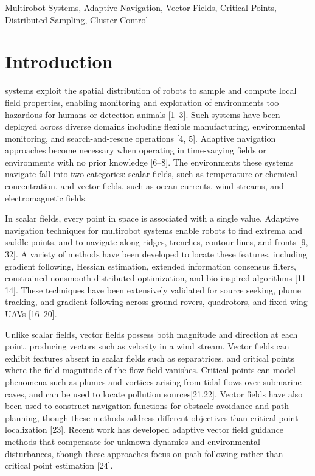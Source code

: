 \documentclass[lettersize,journal]{IEEEtran}
\begin{document}
\begin{IEEEkeywords}
Multirobot Systems, Adaptive Navigation, Vector Fields, Critical Points, Distributed Sampling, Cluster Control
\end{IEEEkeywords}

\section{Introduction}

 systems exploit the spatial distribution of robots to sample and compute local field properties, enabling monitoring and exploration of environments too hazardous for humans or detection animals [1--3]. Such systems have been deployed across diverse domains including flexible manufacturing, environmental monitoring, and search-and-rescue operations [4, 5]. Adaptive navigation approaches become necessary when operating in time-varying fields or environments with no prior knowledge [6--8]. The environments these systems navigate fall into two categories: scalar fields, such as temperature or chemical concentration, and vector fields, such as ocean currents, wind streams, and electromagnetic fields.


In scalar fields, every point in space is associated with a single value. Adaptive navigation techniques for multirobot systems enable robots to find extrema and saddle points, and to navigate along ridges, trenches, contour lines, and fronts [9, 32]. A variety of methods have been developed to locate these features, including gradient following, Hessian estimation, extended information consensus filters, constrained nonsmooth distributed optimization, and bio-inspired algorithms [11--14]. These techniques have been extensively validated for source seeking, plume tracking, and gradient following across ground rovers, quadrotors, and fixed-wing UAVs  [16--20].

Unlike scalar fields, vector fields possess both magnitude and direction at each point, producing vectors such as velocity in a wind stream. Vector fields can exhibit features absent in scalar fields such as separatrices, and critical points where the field magnitude of the flow field vanishes. Critical points can model phenomena such as plumes and vortices arising from tidal flows over submarine caves, and can be used to locate pollution sources[21,22]. Vector fields have also been used to construct navigation functions for obstacle avoidance and path planning, though these methods address different objectives than critical point localization [23]. Recent work has developed adaptive vector field guidance methods that compensate for unknown dynamics and environmental disturbances, though these approaches focus on path following rather than critical point estimation [24].
\end{document}
